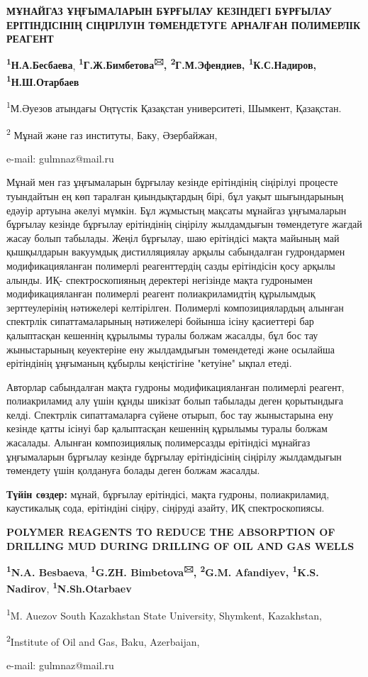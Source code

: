 \begin{center}
{\large\bfseries МҰНАЙГАЗ ҰҢҒЫМАЛАРЫН БҰРҒЫЛАУ КЕЗІНДЕГІ БҰРҒЫЛАУ ЕРІТІНДІСІНІҢ
СІҢІРІЛУІН ТӨМЕНДЕТУГЕ АРНАЛҒАН ПОЛИМЕРЛІК РЕАГЕНТ}

{\bfseries \textsuperscript{1}Н.А.Бесбаева},
{\bfseries \textsuperscript{1}Г.Ж.Бимбетова\textsuperscript{🖂},
\textsuperscript{2}Г.М.Эфендиев, \textsuperscript{1}К.С.Надиров,
\textsuperscript{1}Н.Ш.Отарбаев}

\textsuperscript{1}М.Әуезов атындағы Оңтүстік Қазақстан университеті,
Шымкент, Қазақстан.

\textsuperscript{2} Мұнай және газ институты, Баку, Әзербайжан,

e-mail: gulmnaz@mail.ru
\end{center}

Мұнай мен газ ұңғымаларын бұрғылау кезінде ерітіндінің сіңірілуі
процесте туындайтын ең көп таралған қиындықтардың бірі, бұл уақыт
шығындарының едәуір артуына әкелуі мүмкін. Бұл жұмыстың мақсаты мұнайгаз
ұңғымаларын бұрғылау кезінде бұрғылау ерітіндінің сіңірілу жылдамдығын
төмендетуге жағдай жасау болып табылады. Жеңіл бұрғылау, шаю ерітіндісі
мақта майының май қышқылдарын вакуумдық дистилляциялау арқылы
сабындалған гудрондармен модификацияланған полимерлі реагенттердің сазды
ерітіндісін қосу арқылы алынды. ИҚ- спектроскопияның деректері негізінде
мақта гудронымен модификацияланған полимерлі реагент полиакриламидтің
құрылымдық зерттеулерінің нәтижелері келтірілген. Полимерлі
композициялардың алынған спектрлік сипаттамаларының нәтижелері бойынша
ісіну қасиеттері бар қалыптасқан кешеннің құрылымы туралы болжам
жасалды, бұл бос тау жыныстарының кеуектеріне ену жылдамдығын
төмендетеді және осылайша ерітіндінің ұңғыманың құбырлы кеңістігіне
"кетуіне" ықпал етеді.

Авторлар сабындалған мақта гудроны модификацияланған полимерлі реагент,
полиакриламид алу үшін құнды шикізат болып табылады деген қорытындыға
келді. Спектрлік сипаттамаларға сүйене отырып, бос тау жыныстарына ену
кезінде қатты ісінуі бар қалыптасқан кешеннің құрылымы туралы болжам
жасалады. Алынған композициялық полимерсазды ерітіндісі мұнайгаз
ұңғымаларын бұрғылау кезінде бұрғылау ерітіндісінің сіңірілу жылдамдығын
төмендету үшін қолдануға болады деген болжам жасалды.

{\bfseries Түйін сөздер:} мұнай, бұрғылау ерітіндісі, мақта гудроны,
полиакриламид, каустикалық сода, ерітіндіні сіңіру, сіңіруді азайту, ИҚ
спектроскопиясы.

\begin{center}
{\large\bfseries POLYMER REAGENTS TO REDUCE THE ABSORPTION OF DRILLING MUD DURING
DRILLING OF OIL AND GAS WELLS}

{\bfseries \textsuperscript{1}N.A. Besbaeva},
{\bfseries \textsuperscript{1}G.ZH. Bimbetova\textsuperscript{🖂},
\textsuperscript{2}G.M. Afandiyev, \textsuperscript{1}K.S. Nadirov},
{\bfseries \textsuperscript{1}N.Sh.Otarbaev}

\textsuperscript{1}M. Auezov South Kazakhstan State University,
Shymkent, Kazakhstan,

\textsuperscript{2}Institute of Oil and Gas, Baku, Azerbaijan,

e-mail: gulmnaz@mail.ru
\end{center}

